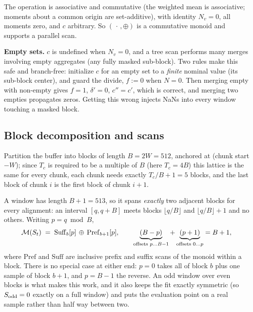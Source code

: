 \documentclass{article}
\numberwithin{equation}{section}   %
\begin{document}
The operation is associative and commutative (the weighted mean is associative; moments about a common origin
are set-additive), with identity $N_v = 0$, all moments zero, and $c$ arbitrary.  So $(\,\cdot\,, \oplus)$ is a
commutative monoid and supports a parallel scan.

{\bf Empty sets.}  $c$ is undefined when $N_v = 0$, and a tree scan performs many merges involving empty
aggregates (any fully masked sub-block).  Two rules make this safe and branch-free: initialize $c$ for an
empty set to a {\em finite} nominal value (its sub-block center), and guard the divide, $f := 0$ when $N = 0$.
Then merging empty with non-empty gives $f = 1$, $\delta' = 0$, $c'' = c'$, which is correct, and merging two
empties propagates zeros.  Getting this wrong injects NaNs into every window touching a masked block.

\subsection{Block decomposition and scans}
\label{sec:dt_blocks}

Partition the buffer into blocks of length $B = 2W = 512$, anchored at (chunk start $- W$); since $T_c$ is
required to be a multiple of $B$ (here $T_c = 4B$) this lattice is the same for every chunk, each chunk needs
exactly $T_c/B + 1 = 5$ blocks, and the last block of chunk $i$ is the first block of chunk $i+1$.

A window has length $B+1 = 513$, so it spans {\em exactly} two adjacent blocks for every alignment: an
interval $[q, q+B]$ meets blocks $\lfloor q/B \rfloor$ and $\lfloor q/B \rfloor + 1$ and no others.  Writing
$p = q \bmod B$,
\begin{equation}
{\cal M}(S_t) \;=\; \mathrm{Suff}_b[p] \,\oplus\, \mathrm{Pref}_{b+1}[p],
\qquad
\underbrace{(B-p)}_{\text{offsets } p \ldots B-1} + \underbrace{(p+1)}_{\text{offsets } 0 \ldots p} = B+1 ,
\label{eq:dt_vanherk}
\end{equation}
where $\mathrm{Pref}$ and $\mathrm{Suff}$ are inclusive prefix and suffix scans of the monoid within a block.
There is no special case at either end: $p=0$ takes all of block $b$ plus one sample of block $b+1$, and
$p = B-1$ the reverse.  An odd window over even blocks is what makes this work, and it also keeps the fit
exactly symmetric (so $S_{\rm odd} = 0$ exactly on a full window) and puts the evaluation point on a real
sample rather than half way between two.
\end{document}
